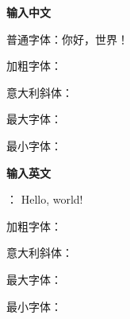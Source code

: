 \documentclass{ctexart}
\begin{document}
\textbf{输入中文}

普通字体：你好，世界！

加粗字体：

意大利斜体：

最大字体：

最小字体：

\textbf{输入英文}

： Hello, world!

加粗字体：

意大利斜体：

最大字体：

最小字体：
\end{document}
